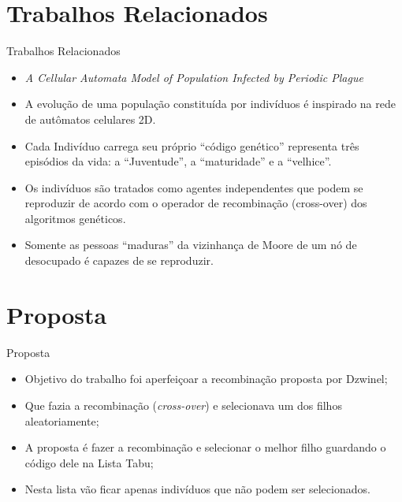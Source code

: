 \documentclass{beamer}
\begin{document}
\section{Trabalhos Relacionados}
\begin{frame}{Trabalhos Relacionados}
	\begin{itemize}
		\item \textit{A Cellular Automata Model of Population Infected by
		Periodic Plague} \cite{dzwinel:04}
		\item A evolução de uma população constituída por indivíduos é
		inspirado na rede de autômatos celulares 2D.
		\item Cada Indivíduo carrega seu próprio ``código genético''
		representa três episódios da vida: a ``Juventude'', a ``maturidade'' e
		a ``velhice''.
		\item Os indivíduos são tratados como agentes independentes que podem
		se reproduzir de acordo com o operador de recombinação (cross-over)
		dos algoritmos genéticos.
		\item Somente as pessoas ``maduras'' da vizinhança de Moore de um nó
		de desocupado é capazes de se reproduzir.
	\end{itemize}
\end{frame}

\section{Proposta}
\begin{frame}{Proposta}
	\begin{itemize}
		\item Objetivo do trabalho foi aperfeiçoar a recombinação proposta
		por Dzwinel;
		\item Que fazia a recombinação (\textit{cross-over}) e selecionava
		um dos filhos aleatoriamente;
		\item A proposta é fazer a recombinação e selecionar o melhor filho
		guardando o código dele na Lista Tabu;
		\item Nesta lista vão ficar apenas indivíduos que não podem ser
		selecionados.  
	\end{itemize}
\end{frame}

\end{document}
